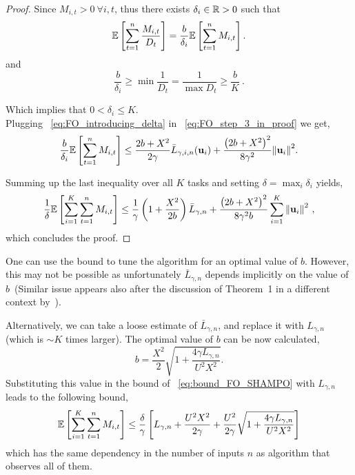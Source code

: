 {\begin{proof}
\noindent
Since $M_{i,t}>0 ~\forall{i,t}$, thus there exists $\delta_i\in\mathbb{R}>0$ such that 
\begin{equation}
\label{eq:FO_introducing_delta}
\mathbb{E}\left[{\sum_{t=1}^{n}{\frac{M_{i,t}}{D_{t}}}}\right] = 
\frac{b}{\delta_i}\mathbb{E}\left[{\sum_{t=1}^{n}{M_{i,t}}}\right].
\end{equation}
and
\begin{equation}
\frac{b}{\delta_i} \geq \min\frac{1}{D_t}  = \frac{1}{\max D_t}  \geq 
\frac{b}{K}~.
\label{eq:FO_bound_on_D}
\end{equation}

\noindent
Which implies that $0<\delta_i\le K$.\\
Plugging ~\eqref{eq:FO_introducing_delta} in ~\eqref{eq:FO_step_3_in_proof} we get,
\begin{equation*}
\frac{b}{\delta_i}\mathbb{E}\left[ \sum_{t=1}^{n}{M_{i,t}} \right]
\le \frac{2b+X^2}{2\gamma}{\bar L}_{\gamma,i,n}(\mathbf{u}_{i})+\frac{\left({2b+X^2}\right)^2}{8{\gamma}^2}{\left\Vert \mathbf{u}_{i} \right\Vert}^2.
\end{equation*}

\noindent
Summing up the last inequality over all $K$ tasks and setting $\delta
= \max_i \delta_i$ yields, 
\begin{equation}
\begin{split}
\frac{1}{\delta}\mathbb{E}\left[ \sum_{i=1}^{K}\sum_{t=1}^{n}{M_{i,t}} \right]
\le\frac{1}{\gamma}\left(1+\frac{X^2}{2b} \right){\bar L}_{\gamma,n}+
\frac{\left({2b+X^2}\right)^2}{8{\gamma}^2b}\sum_{i=1}^{K}{{\left\Vert \mathbf{u}_{i} 
\right\Vert}^2}~,
\end{split}
\label{eq:FO_final_eq_in_proof}
\end{equation}
which concludes the proof.
\QED
\end{proof}

\noindent
One can use the bound to tune the algorithm for an optimal value of
$b$. However, this may not be possible as unfortunately ${\bar L}_{\gamma,n}$ depends
implicitly on the value of $b$\ (Similar issue appears also 
after the discussion of Theorem~1 in a different context by~\cite{cesa2006worst}).

\noindent
Alternatively, we can take a
loose estimate of ${\bar L}_{\gamma,n}$, and replace it with
$L_{\gamma,n}$ (which is $\sim K$ times larger). The optimal value of
$b$ can be now calculated, 
\begin{displaymath}
b=\frac{X^2}{2}{\sqrt{1+\frac{4\gamma L_{\gamma,n}}{U^{2}X^2}}}.
\end{displaymath}
Substituting this value in the bound of ~\eqref{eq:bound_FO_SHAMPO} with
$L_{\gamma,n}$ leads to the following bound, 
\begin{equation*}
\mathbb{E}\left[{\sum_{i=1}^{K}\sum_{t=1}^{n}{M_{i,t}}}\right]
\le\frac{\delta}{\gamma}\left[{L_{\gamma,n}+\frac{U^{2}X^2}{2\gamma}+\frac{U^{2}}{2\gamma}\sqrt{1+\frac{4\gamma L_{\gamma,n}}{U^{2}X^2}}}\right]
\end{equation*}
which has the same dependency in the number of inputs $n$ as algorithm
that observes all of them.

}

